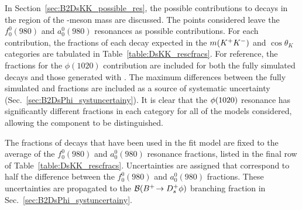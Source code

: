 


In Section~\ref{sec:B2DsKK_possible_res}, the possible contributions to \decay{\Bp}{\Dsp\Kp\Km} decays in the region of the \phiz-meson mass are discussed. The points considered leave the $f_{0}^{0}(980)$ and $a_{0}^{0}(980)$ resonances as possible contributions. 
For each contribution, the fractions of each decay expected in the $m({{K}^+}{{K}^-})$ and $\cos\theta_{K}$ categories are tabulated in Table~\ref{table:DsKK_rescfracs}. 
For reference, the fractions for the $\phi(1020)$ contribution are included for both the fully simulated decays and those generated with \laurapp. The maximum differences between the fully simulated and \laurapp fractions are included as a source of systematic uncertainty (Sec.~\ref{sec:B2DsPhi_systuncertainy}).
It is clear that the $\phi(1020)$ resonance has significantly different fractions in each category for all of the models considered, allowing the component to be distinguished.   



The fractions of \decay{\Bp}{\Dsp\Kp\Km} decays that have been used in the fit model are fixed to the average of the $f_{0}^{0}(980)$ and $a_{0}^{0}(980)$ resonance fractions, listed in the final row of Table~\ref{table:DsKK_rescfracs}. Uncertainties are assigned that correspond to half the difference between the $f_{0}^{0}(980)$ and $a_{0}^{0}(980)$ fractions. These uncertainties are propagated to the ${\mathcal{B}}({{{B}^+}}\!\rightarrow {\ensuremath{{D}^+_{s}}}\phi)$ branching fraction in Sec.~\ref{sec:B2DsPhi_systuncertainy}. 


